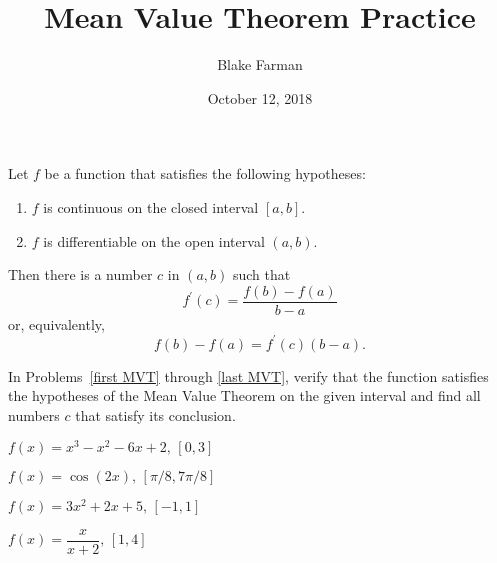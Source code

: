 \documentclass[10pt]{amsart}
\title[Mean Value Theorem]{Mean Value Theorem Practice}
\date{October 12, 2018}
\author{Blake Farman}
\begin{document}
\maketitle

\makenameslot

\begin{thm*}
  Let \(f\) be a function that satisfies the following hypotheses:
  \begin{enumerate}
  \item
    \(f\) is continuous on the closed interval \([a,b]\).
  \item
    \(f\) is differentiable on the open interval \((a,b)\).
  \end{enumerate}
  Then there is a number \(c\) in \((a,b)\) such that
  \[f^\prime(c) = \frac{f(b) - f(a)}{b - a}\]
  or, equivalently,
  \[f(b) - f(a) = f^\prime(c)(b - a).\]
\end{thm*}

In Problems~\ref{first MVT} through \ref{last MVT}, verify that the function satisfies the hypotheses of the Mean Value Theorem on the given interval and find all numbers \(c\) that satisfy its conclusion.
\begin{thm}\label{first MVT}
  \(f(x) = x^3 - x^2 - 6x + 2,\, [0,3]\)
\end{thm}

\begin{thm}
  \(f(x) = \cos(2x),\, [\pi/8, 7\pi/8]\)
\end{thm}

\begin{thm}
    \(f(x) = 3x^2 + 2x + 5,\, [-1,1]\)
\end{thm}

\begin{thm}\label{last MVT}
  \(f(x) = \dfrac{x}{x + 2},\, [1,4]\)
\end{thm}
\end{document}
